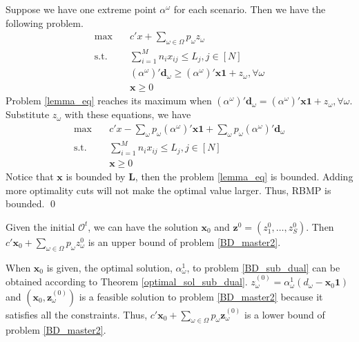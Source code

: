 \begin{pf}
  Suppose we have one extreme point $\alpha^{\omega}$ for each scenario. Then we have the following problem.
  \begin{equation}\label{lemma_eq}
    \begin{aligned}
      \max \quad & c{'} x + \sum_{\omega \in \Omega} p_{\omega} z_{\omega} \\
      \text {s.t.} \quad & \sum_{i=1}^{M} n_{i} x_{ij} \leq L_j, j \in [N] \\
      & (\alpha^{\omega}){'}\mathbf{d}_{\omega} \geq (\alpha^{\omega}){'} \mathbf{x} \mathbf{1} + z_{\omega}, \forall \omega \\
       & \mathbf{x} \geq 0
    \end{aligned}
  \end{equation}
  Problem \eqref{lemma_eq} reaches its maximum when $(\alpha^{\omega}){'}\mathbf{d}_{\omega} = (\alpha^{\omega}){'} \mathbf{x} \mathbf{1} + z_{\omega}, \forall \omega$. Substitute $z_{\omega}$ with these equations, we have 
  \begin{equation}\label{lemma_eq2}
    \begin{aligned}
      \max \quad & c{'} x - \sum_{\omega}p_{\omega}(\alpha^{\omega}){'} \mathbf{x} \mathbf{1} + \sum_{\omega} p_{\omega} (\alpha^{\omega}){'} \mathbf{d}_{\omega} \\
      \text {s.t.} \quad & \sum_{i=1}^{M} n_{i} x_{ij} \leq L_j, j \in [N] \\
      & \mathbf{x} \geq 0
    \end{aligned}
  \end{equation}
  Notice that $\mathbf{x}$ is bounded by $\mathbf{L}$, then the problem \eqref{lemma_eq} is bounded. Adding more optimality cuts will not make the optimal value larger. Thus, RBMP is bounded. 
  \qed
\end{pf}

Given the initial $\mathcal{O}^{t}$, we can have the solution $\mathbf{x}_{0}$ and $\mathbf{z}^{0} =(z^{0}_1,\ldots, z^{0}_S)$. Then $c{'} \mathbf{x}_0 + \sum_{\omega \in \Omega} p_{\omega} z_{\omega}^{0}$ is an upper bound of problem \eqref{BD_master2}. 


When $\mathbf{x}_0$ is given, the optimal solution, $\alpha_{\omega}^{1}$, to problem \eqref{BD_sub_dual} can be obtained according to Theorem \ref{optimal_sol_sub_dual}. $z_{\omega}^{(0)} = \alpha_{\omega}^{1}(d_{\omega} - \mathbf{x}_0 \mathbf{1})$ and $(\mathbf{x}_0, \mathbf{z}_{\omega}^{(0)})$ is a feasible solution to problem \eqref{BD_master2} because it satisfies all the constraints. Thus, $c{'} \mathbf{x}_0 + \sum_{\omega \in \Omega} p_{\omega} \mathbf{z}_{\omega}^{(0)}$ is a lower bound of problem \eqref{BD_master2}.

